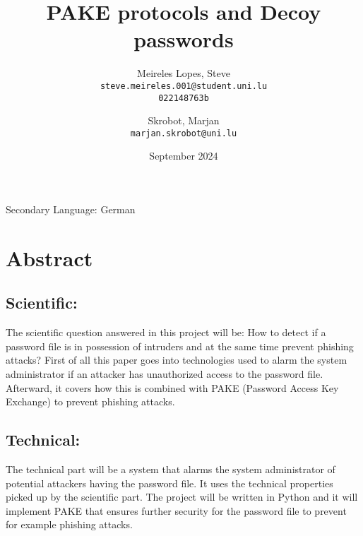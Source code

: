 \documentclass[11pt,a4paper,english]{article}
\title{PAKE protocols and Decoy passwords}
\date{September 2024}
\author{
  Meireles Lopes, Steve\\
  \texttt{steve.meireles.001@student.uni.lu}\\
  \texttt{022148763b}
  \and
  Skrobot, Marjan\\
  \texttt{marjan.skrobot@uni.lu}
}
\begin{document}
\maketitle
Secondary Language: German
\section{Abstract}
\subsection{Scientific:}
The scientific question answered in this project will be: How to detect if a
password file is in possession of intruders and at the same time prevent
phishing attacks? First of all this paper goes into technologies used to alarm
the system administrator if an attacker has unauthorized access to the password
file. Afterward, it covers how this is combined with PAKE (Password Access
Key Exchange) to prevent phishing attacks. 

\subsection{Technical:}
The technical part will be a system that alarms the system administrator of
potential attackers having the password file. It uses the technical properties
picked up by the scientific part. The project will be written in Python and it
will implement PAKE that ensures further security for the password file to
prevent for example phishing attacks.
\end{document}
